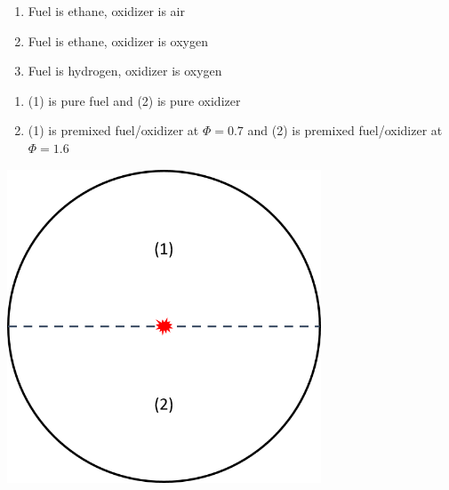 \documentclass[11pt]{article}
\begin{document}
\begin{itemize}
\begin{minipage}{0.48\textwidth}
\begin{enumerate}
	\item Fuel is ethane, oxidizer is air
	\item Fuel is ethane, oxidizer is oxygen
	\item Fuel is hydrogen, oxidizer is oxygen
	\end{enumerate}
	
	\begin{enumerate}[label=(\alph*)]
	\item (1) is pure fuel and (2) is pure oxidizer
	\item (1) is premixed fuel/oxidizer at $\Phi=0.7$ and (2) is premixed fuel/oxidizer at $\Phi=1.6$
	\end{enumerate}
\end{minipage}
\begin{minipage}{0.48\textwidth}
	\centering
	\includegraphics[width=0.7\textwidth]{Graphics/fuel_ox_sphere.png}
\end{minipage}


\end{itemize}
\end{document}
